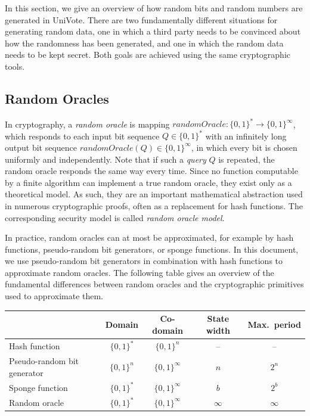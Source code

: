 \documentclass[bibtotoc,halfparskip,oneside]{scrreprt}
\begin{document}
In this section, we give an overview of how random bits and random numbers are generated in UniVote. There are two fundamentally different situations for generating random data, one in which a third party needs to be convinced about how the randomness has been generated, and one in which the random data needs to be kept secret. Both goals are achieved using the same cryptographic tools.

\subsection{Random Oracles}

In cryptography, a \emph{random oracle} is mapping $\mathit{randomOracle}:\{0,1\}^*\rightarrow \{0,1\}^\infty$, which responds to each input bit sequence $Q\in \{0,1\}^*$ with an infinitely long  output bit sequence $\mathit{randomOracle}(Q)\in\{0,1\}^{\infty}$, in which every bit is chosen uniformly and independently. Note that if such a \emph{query} $Q$ is repeated, the random oracle responds the same way every time. Since no function computable by a finite algorithm can implement a true random oracle, they exist only as a theoretical model. As such, they are an important mathematical abstraction used in numerous cryptographic proofs, often as a replacement for hash functions. The corresponding security model is called \emph{random oracle model}.

In practice, random oracles can at most be approximated, for example by hash functions, pseudo-random bit generators, or sponge functions. In this document, we use pseudo-random bit generators in combination with hash functions to approximate random oracles. The following table gives an overview of the fundamental differences between random oracles and the cryptographic primitives used to approximate them. 

\begin{center}
\begin{tabular}{l|c|c|c|c}
 & Domain & Co-domain & State width & Max.\ period \\\hline
Hash function & $\{0,1\}^*$ & $\{0,1\}^n$ & -- & -- \\
Pseudo-random bit generator & $\{0,1\}^n$ & $\{0,1\}^\infty$ & $n$ &$2^n$ \\
Sponge function & $\{0,1\}^*$ & $\{0,1\}^\infty$ & $b$ & $2^b$\\\hline
Random oracle & $\{0,1\}^*$ & $\{0,1\}^\infty$ & $\infty$ & $\infty$ \\
\end{tabular}
\end{center}
\end{document}
